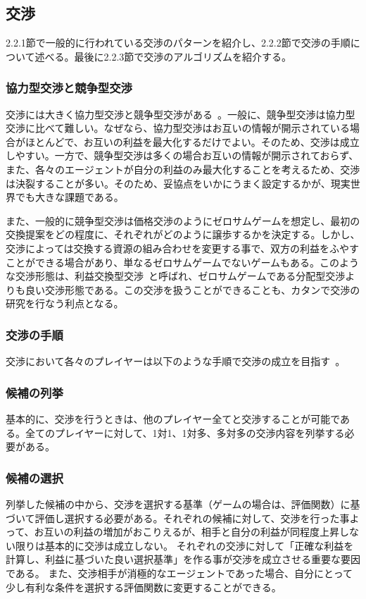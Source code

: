 \documentclass[a4, 10pt,dvipdfmx]{jsarticle}
\begin{document}
\subsection{交渉}
2.2.1節で一般的に行われている交渉のパターンを紹介し、2.2.2節で交渉の手順について述べる。最後に2.2.3節で交渉のアルゴリズムを紹介する。

\subsubsection{協力型交渉と競争型交渉}
交渉には大きく協力型交渉と競争型交渉がある~\cite{anguix2013complex}。一般に、競争型交渉は協力型交渉に比べて難しい。なぜなら、協力型交渉はお互いの情報が開示されている場合がほとんどで、お互いの利益を最大化するだけでよい。そのため、交渉は成立しやすい。一方で、競争型交渉は多くの場合お互いの情報が開示されておらず、また、各々のエージェントが自分の利益のみ最大化することを考えるため、交渉は決裂することが多い。そのため、妥協点をいかにうまく設定するかが、現実世界でも大きな課題である。

また、一般的に競争型交渉は価格交渉のようにゼロサムゲームを想定し、最初の交換提案をどの程度に、それぞれがどのように譲歩するかを決定する。しかし、交渉によっては交換する資源の組み合わせを変更する事で、双方の利益をふやすことができる場合があり、単なるゼロサムゲームでないゲームもある。このような交渉形態は、利益交換型交渉~\cite{開発2009kobe}と呼ばれ、ゼロサムゲームである分配型交渉よりも良い交渉形態である。この交渉を扱うことができることも、カタンで交渉の研究を行なう利点となる。

\subsubsection{交渉の手順}
交渉において各々のプレイヤーは以下のような手順で交渉の成立を目指す~\cite{安村禎明2002モノポリーゲームにおける交渉エージェント}。
\subsubsection*{候補の列挙}
基本的に、交渉を行うときは、他のプレイヤー全てと交渉することが可能である。全てのプレイヤーに対して、1対1、1対多、多対多の交渉内容を列挙する必要がある。

\subsubsection*{候補の選択}
列挙した候補の中から、交渉を選択する基準（ゲームの場合は、評価関数）に基づいて評価し選択する必要がある。それぞれの候補に対して、交渉を行った事よって、お互いの利益の増加がおこりえるが、相手と自分の利益が同程度上昇しない限りは基本的に交渉は成立しない。
それぞれの交渉に対して「正確な利益を計算し、利益に基づいた良い選択基準」を作る事が交渉を成立させる重要な要因である。
また、交渉相手が消極的なエージェントであった場合、自分にとって少し有利な条件を選択する評価関数に変更することができる。
\end{document}
